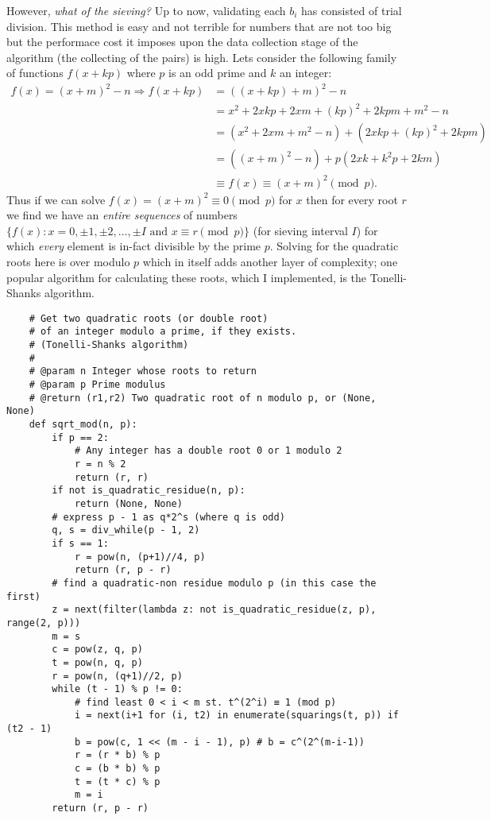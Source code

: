 \documentclass{report}
\begin{document}
However, \emph{what of the sieving?}
Up to now, validating each $b_i$ has consisted of trial division.
This method is easy and not terrible for numbers that are not too big but the performace cost it
imposes upon the data collection stage of the algorithm (the collecting of the pairs) is high.
Lets consider the following family of functions $f(x+kp)$ where $p$ is an odd prime and $k$ an
integer:
\begin{equation}
    \begin{aligned}
        f(x)=(x+m)^2-n \Rightarrow
        f(x+kp)
        &= ((x+kp)+m)^2 - n \\
        &= x^2+2xkp+2xm+(kp)^2+2kpm+m^2-n \\
        &= (x^2+2xm+m^2-n) + (2xkp+(kp)^2+2kpm) \\
        &= ((x+m)^2-n)+p(2xk+k^2 p+2km) \\
        &\equiv f(x) \equiv (x+m)^2 \pmod{p}.
    \end{aligned}
\end{equation}
Thus if we can solve $f(x) = (x+m)^2 \equiv 0\pmod p$ for $x$ then for every root $r$ we find we
have an \emph{entire sequences} of numbers $\{f(x):x=0,\pm 1,\pm 2,\ldots,\pm I\text { and }x\equiv
r\pmod p\}$ (for sieving interval $I$) for which \emph{every} element is in-fact divisible by the
prime $p$.
Solving for the quadratic roots here is over modulo $p$ which in itself adds another layer of
complexity; one popular algorithm for calculating these roots, which I implemented, is the
Tonelli-Shanks algorithm.
\begin{verbatim}
    # Get two quadratic roots (or double root)
    # of an integer modulo a prime, if they exists.
    # (Tonelli-Shanks algorithm)
    #
    # @param n Integer whose roots to return
    # @param p Prime modulus
    # @return (r1,r2) Two quadratic root of n modulo p, or (None, None)
    def sqrt_mod(n, p):
        if p == 2:
            # Any integer has a double root 0 or 1 modulo 2
            r = n % 2
            return (r, r)
        if not is_quadratic_residue(n, p):
            return (None, None)
        # express p - 1 as q*2^s (where q is odd)
        q, s = div_while(p - 1, 2)
        if s == 1:
            r = pow(n, (p+1)//4, p)
            return (r, p - r)
        # find a quadratic-non residue modulo p (in this case the first)
        z = next(filter(lambda z: not is_quadratic_residue(z, p), range(2, p)))
        m = s
        c = pow(z, q, p)
        t = pow(n, q, p)
        r = pow(n, (q+1)//2, p)
        while (t - 1) % p != 0:
            # find least 0 < i < m st. t^(2^i) ≡ 1 (mod p)
            i = next(i+1 for (i, t2) in enumerate(squarings(t, p)) if (t2 - 1)
            b = pow(c, 1 << (m - i - 1), p) # b = c^(2^(m-i-1))
            r = (r * b) % p
            c = (b * b) % p
            t = (t * c) % p
            m = i
        return (r, p - r)
\end{verbatim}
\end{document}
